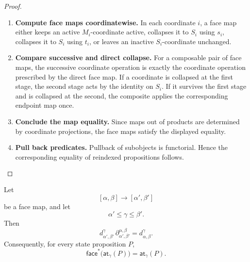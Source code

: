 \begin{proof}
    \leavevmode
    \begin{enumerate}
        \item \textbf{Compute face maps coordinatewise.}
        In each coordinate \(i\), a face map either keeps an active
        \(M_i\)-coordinate active, collapses it to \(S_i\) using \(s_i\),
        collapses it to \(S_i\) using \(t_i\), or leaves an inactive
        \(S_i\)-coordinate unchanged.

        \item \textbf{Compare successive and direct collapse.}
        For a composable pair of face maps, the successive coordinate
        operation is exactly the coordinate operation prescribed by the direct
        face map. If a coordinate is collapsed at the first stage, the second
        stage acts by the identity on \(S_i\). If it survives the first stage
        and is collapsed at the second, the composite applies the
        corresponding endpoint map once.

        \item \textbf{Conclude the map equality.}
        Since maps out of products are determined by coordinate projections,
        the face maps satisfy the displayed equality.

        \item \textbf{Pull back predicates.}
        Pullback of subobjects is functorial. Hence the corresponding
        equality of reindexed propositions follows.
    \end{enumerate}
\end{proof}

\begin{proposition}
\label{prop:cmett-vertex-substitution-law}
    Let
    \[
        [\alpha,\beta]\to[\alpha',\beta']
    \]
    be a face map, and let
    \[
        \alpha'\leq\gamma\leq\beta'.
    \]
    Then
    \[
        d_{\alpha',\beta'}^\gamma
        \,
        \partial_{\alpha',\beta'}^{\alpha,\beta}
        =
        d_{\alpha,\beta}^{\gamma}.
    \]
    Consequently, for every state proposition \(P\),
    \[
        \mathsf{face}^*\bigl(\mathsf{at}_{\gamma}(P)\bigr)
        =
        \mathsf{at}_{\gamma}(P).
    \]
\end{proposition}

